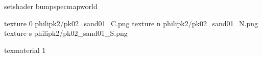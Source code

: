 setshader bumpspecmapworld

texture 0 philipk2/pk02_sand01_C.png
texture n philipk2/pk02_sand01_N.png
texture s philipk2/pk02_sand01_S.png

texmaterial 1
